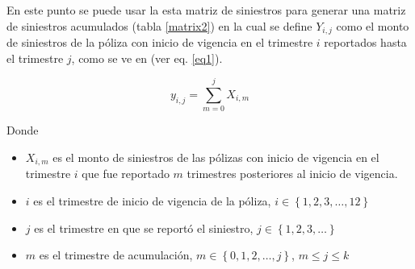 \documentclass[11pt,twoside,openright,spanish]{report}
\numberwithin{equation}{chapter}
\numberwithin{figure}{chapter}
\numberwithin{table}{chapter}
\begin{document}
	\vspace{1cm}

	En este punto se puede usar la esta matriz de siniestros para generar una matriz de siniestros acumulados (tabla \ref{matrix2}) en la cual se define ${Y}_{i,j}$ como el monto de siniestros de la póliza con inicio de vigencia en el trimestre $i$ reportados hasta el trimestre $j$, como se ve en \citet{PAlvColl} (ver eq. \ref{eq1}).
	
	\begin{equation}
	{y}_{i,j}=\sum _{m=0}^{j}{X}_{i,m}
		\label{eq1}
	\end{equation}

	Donde
	
	\begin{itemize}
	\setlength\itemsep{-0.5em}
		\item ${X}_{i,m}$ es el monto de siniestros de las pólizas con inicio de vigencia en el trimestre $i$ que fue reportado $m$ trimestres posteriores al inicio de vigencia.
		\item $i$ es el trimestre de inicio de vigencia de la póliza, $i\in \left\{1,2,3,\dots ,12\right\}$
		\item $j$ es el trimestre en que se reportó el siniestro,  $j\in \left\{1,2,3,\dots\right\}$
		\item $m$ es el trimestre de acumulación, $m\in \left\{0,1,2,\dots ,j\right\}$, $m\le j\le k$
	\end{itemize} 
	
\end{document}
